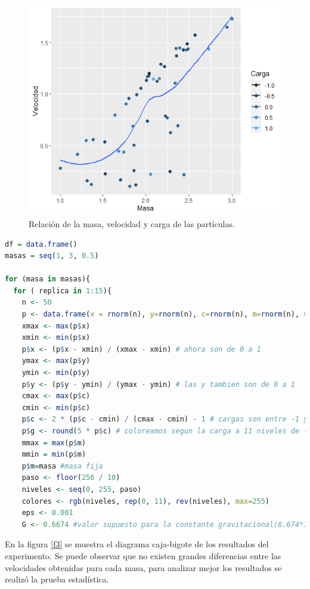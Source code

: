 \documentclass{article}
\begin{document}
\begin{figure} [h!]%
    \centering
    \includegraphics[width=150mm]{Figura5.png} %
    \caption{Relación de la masa, velocidad y carga de las partículas.}
    \label{f2}
\end{figure}

\lstset{style=mystyle}
\begin{lstlisting}[language=R, caption= Código para analizar masas fijas de $1$ a $3$ en pasos de $0.5$ y hacer $15$ réplicas del experimento para cada masa.]
df = data.frame()
masas = seq(1, 3, 0.5)

for (masa in masas){
  for ( replica in 1:15){
    n <- 50
    p <- data.frame(x = rnorm(n), y=rnorm(n), c=rnorm(n), m=rnorm(n), vel = numeric(n))
    xmax <- max(p$x)
    xmin <- min(p$x)
    p$x <- (p$x - xmin) / (xmax - xmin) # ahora son de 0 a 1
    ymax <- max(p$y)
    ymin <- min(p$y)
    p$y <- (p$y - ymin) / (ymax - ymin) # las y tambien son de 0 a 1
    cmax <- max(p$c)
    cmin <- min(p$c)
    p$c <- 2 * (p$c - cmin) / (cmax - cmin) - 1 # cargas son entre -1 y 1
    p$g <- round(5 * p$c) # coloreamos segun la carga a 11 niveles de -5 a 5
    mmax = max(p$m) 
    mmin = min(p$m)
    p$m=masa #masa fija
    paso <- floor(256 / 10)
    niveles <- seq(0, 255, paso)
    colores <- rgb(niveles, rep(0, 11), rev(niveles), max=255)
    eps <- 0.001
    G <- 0.6674 #valor supuesto para la constante gravitacional(6.674*10^(-11))
\end{lstlisting}

En la figura \ref{f3} se muestra el diagrama caja-bigote de los resultados del experimento. Se puede observar que no existen grandes diferencias entre las velocidades obtenidas para cada masa, para analizar mejor los resultados se realizó la prueba estadística.
\end{document}
